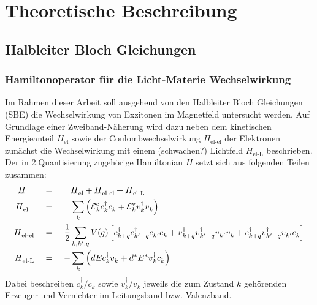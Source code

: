 \documentclass[a4paper,11pt, twoside]{article}
\newcommand{\ind}[2]{{_{#1}^{#2}}}
\newcommand{\+}{\dagger}
\newcommand{\E}{\mathcal{E}}
\renewcommand{\'}{\tt\textquotesingle}
\renewcommand{\^}{\hat}
\renewcommand{\tt}{\text}
\renewcommand{\~}{\widetilde}
\begin{document}
\tableofcontents
\newpage
\section{Theoretische Beschreibung}
\subsection{Halbleiter Bloch Gleichungen}
\subsubsection{Hamiltonoperator für die Licht-Materie Wechselwirkung}
Im Rahmen dieser Arbeit soll ausgehend von den Halbleiter Bloch Gleichungen (SBE) die Wechselwirkung von Exzitonen im Magnetfeld untersucht werden. Auf Grundlage einer Zweiband-Näherung wird dazu neben dem kinetischen Energieanteil $H\ind{\tt{el}}{}$ sowie der Coulombwechselwirkung $H\ind{\tt{el-el}}{}$ der Elektronen zunächst die Wechselwirkung mit einem (schwachen?) Lichtfeld $H\ind{\tt{el-L}}{}$ beschrieben. Der in 2.Quantisierung zugehörige Hamiltonian $H$ setzt sich aus folgenden Teilen zusammen: 
\begin{alignat*}{3}
H \quad  				&&\ = \ && &H\ind{\tt{el}}{} +H\ind{\tt {el-el}}{}+H\ind{\tt {el-L}}{} \\
H\ind{\tt{el}}{} 	\ \	&&\ = \ && &\sum_k\left (			\E \ind{k}{\tt c} c\ind{k}{\+}c\ind{k}{} +\E \ind{k}{\tt {v}}v\ind{k}{\+}v\ind{k}{}    	\right ) \\
H\ind{\tt {el-el}}{} &&\ = \ &&\frac{1}{2}&\sum_{k,k',q} V(q)\left [			c\ind{k+q}{\+} c\ind{k'-q}{\+}c\ind{k'}{}c\ind{k}{} +v\ind{k+q}{\+}v\ind{k'-q}{\+}v\ind{k'}{}v\ind{k}{}   +  	 	c\ind{k+q}{\+}v\ind{k'-q}{\+}v\ind{k'}{}c\ind{k}{}    	\right ] \\
H\ind{\tt {el-L}}{} 	&&\ = \ && -&\sum_{k} \left (dE c\ind{k}{\+}v\ind{k}{} + d^*E^*v\ind{k}{\+}c\ind{k}{}\right ) 
\end{alignat*}
Dabei beschreiben $c\ind{k}{\+}/c\ind{k}{}$ sowie $v\ind{k}{\+}/v\ind{k}{}$ jeweils die zum Zustand $k$ gehörenden Erzeuger und Vernichter im Leitungsband bzw. Valenzband. 
\end{document}

